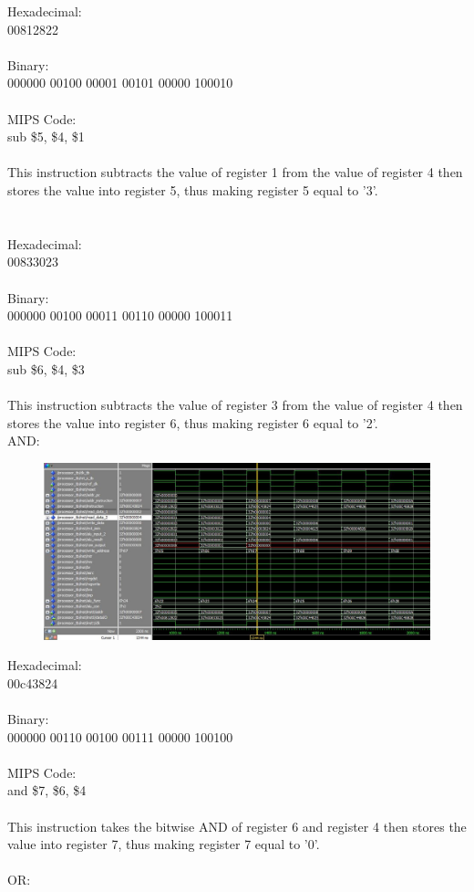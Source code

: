 \documentclass[paper=letter, fontsize=11pt]{scrartcl} %
\numberwithin{equation}{section}
\numberwithin{figure}{section}
\numberwithin{table}{section}
\begin{document}
Hexadecimal:
\\
00812822
\\
\\
Binary:
\\
000000 00100 00001 00101 00000 100010
\\
\\
MIPS Code:
\\
sub \$5, \$4, \$1
\\
\\
This instruction subtracts the value of register 1 from the value of register 4 then stores the value into register 5, thus making register 5 equal to '3'.
\\
\\
\\
Hexadecimal:
\\
00833023
\\
\\
Binary:
\\
000000 00100 00011 00110 00000 100011
\\
\\
MIPS Code:
\\
sub \$6, \$4, \$3
\\
\\
This instruction subtracts the value of register 3 from the value of register 4 then stores the value into register 6, thus making register 6 equal to '2'.
\pagebreak
\\
AND:

\begin{figure}[H]
	\centering
		\includegraphics[width=150mm]{../sim/photo/and.JPG}
	\label{fig:AND}
\end{figure}

Hexadecimal:
\\
00c43824
\\
\\
Binary:
\\
000000 00110 00100 00111 00000 100100
\\
\\
MIPS Code:
\\
and \$7, \$6, \$4
\\
\\
This instruction takes the bitwise AND of register 6 and register 4 then stores the value into register 7, thus making register 7 equal to '0'.
\\
\pagebreak
\\
OR:
\end{document}
